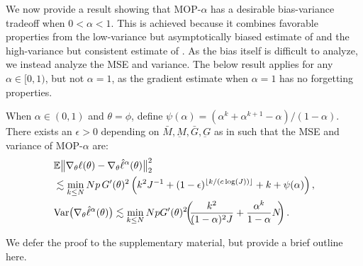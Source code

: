\documentclass[9pt,twocolumn,pnasresearcharticle]{pnas-new}
\newcommand\arxiv[2]{#2} %
\begin{document}
We now provide a result showing that MOP-$\alpha$ has a desirable bias-variance tradeoff when $0<\alpha<1$.
This is achieved because it combines favorable properties from the low-variance but asymptotically biased estimate of \cite{naesseth18} and the high-variance but consistent estimate of \cite{poyiadjis11}. 
As the bias itself is difficult to analyze, we instead analyze the MSE and variance. 
The below result applies for any $\alpha \in [0,1)$, but not $\alpha=1$, as the gradient estimate when $\alpha=1$ has no forgetting properties. 

\begin{thm}
    \label{thm:mop-biasvar}
    When $\alpha\in (0,1)$ and $\theta=\phi$, define $\psi(\alpha)=(\alpha^k  + \alpha^{k+1} - \alpha)/(1-\alpha)$. 
    There exists an $\epsilon>0$ depending on $\bar{M}, \underbar{M}, \bar{G}, \underbar{G}$ as in \cite{karjalainen23} such that the MSE and variance of MOP-$\alpha$ are:
    \vspace*{-1ex}
    \arxiv{\begin{eqnarray}
        \E\big\|\nabla_\theta\ell(\theta) - \nabla_\theta \hat\ell^\alpha(\theta)\big\|_2^2 
        &\lesssim& \min_{k \leq N} Np \, G'(\theta)^2\left(k^2J^{-1}+(1-\epsilon)^{\floor{k/(c\log(J))}}+k+\psi(\alpha)\right), \label{eq:mop-mse}
        \\
        \Var\big(\nabla_\theta \hat\ell^{\alpha}(\theta)\big) &\lesssim& \min_{k\leq N} Np \, G'(\theta)^2\left(\frac{k^2}{(1-\alpha)^2J} + \frac{\alpha^{k}}{1-\alpha}N\right). \label{eq:mop-variance}
        \end{eqnarray}}{\begin{align}
        &\mathbb{E}\big\|\nabla_\theta\ell(\theta) - \nabla_\theta \hat\ell^\alpha(\theta)\big\|_2^2 \label{eq:mop-mse}\\
        &\lesssim \min_{k \leq N} Np \, G'(\theta)^2\left(k^2J^{-1}+(1-\epsilon)^{\lfloor k/(c\log(J)) \rfloor}+k+\psi(\alpha)\right), \nonumber 
        \\
        &\mathrm{Var}\big(\nabla_\theta \hat\ell^{\alpha}(\theta)\big) \lesssim \min_{k\leq N} Np  G'(\theta)^2\hspace{-0.8ex}\left(\hspace{-0.8ex}\frac{k^2}{(1-\alpha)^2J} + \frac{\alpha^{k}}{1-\alpha}N\hspace{-0.8ex}\right). \label{eq:mop-variance}
        \end{align}}
\end{thm}
We defer the proof to \arxiv{Appendix~\ref{appendix:biasvar}}{the supplementary material}, but provide a brief outline here. 
\end{document}
